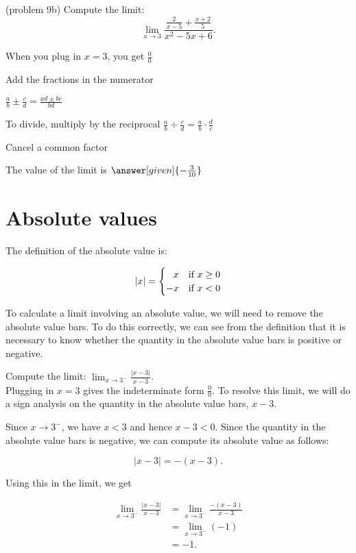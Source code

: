 \documentclass{ximera}
\begin{document}
\begin{problem}(problem 9b)
  Compute the limit:
  \[
    \lim_{x \to 3} \frac{\frac{2}{x-5} + \frac{x+2}{5}}{x^2 - 5x + 6}.
  \]
  
    \begin{hint}
      When you plug in $x = 3$, you get $\frac00$
    \end{hint}
    \begin{hint}
      Add the fractions in the numerator
    \end{hint}
    \begin{hint}
      $\frac{a}{b} \pm \frac{c}{d} = \frac{ad \pm bc}{bd}$
    \end{hint}
    \begin{hint}
      To divide, multiply by the reciprocal $\frac{a}{b} \div \frac{c}{d} = \frac{a}{b} \cdot \frac{d}{c}$ 
    \end{hint}
    \begin{hint}
      Cancel a common factor
    \end{hint}
		The value of the limit is
		 $\answer[given]{-\frac{3}{10}}$
		
\end{problem}




\section{Absolute values}


The definition of the absolute value is:

\[
\left | x \right | = 
\begin{cases}
\hfill x & \text{if $x\geq 0$}\\         -x & \text{if $x<0$}
\end{cases}
\] 

To calculate a limit involving an absolute value, we will need to remove the absolute value bars. 
To do this correctly, we can see from the definition that it is necessary to know whether the 
quantity in the absolute value bars is positive or negative.


\begin{example}[example 10]
Compute the limit: $\displaystyle{\lim_{x \to 3^{-}} \frac{|x-3|}{x-3}}$.\\
Plugging in $x = 3$ gives the indeterminate form $\frac00$. To resolve this limit, 
we will do a sign analysis on the quantity in the absolute value bars, $x-3$.

Since $x \to 3^-$, we have $x<3$ and hence $x-3 <0$. Since the quantity in the absolute value bars is negative, 
we can compute its absolute value as follows:

\[|x-3| = -(x-3).\]

Using this in the limit, we get

\begin{align*}
\lim_{x \to 3^-} \frac{|x-3|}{x-3} &= \lim_{x \to 3^-} \frac{-(x-3)}{x-3} \\
&= \lim_{x \to 3^-} (-1) \\
&= -1.
\end{align*}
\end{example}
\end{document}
